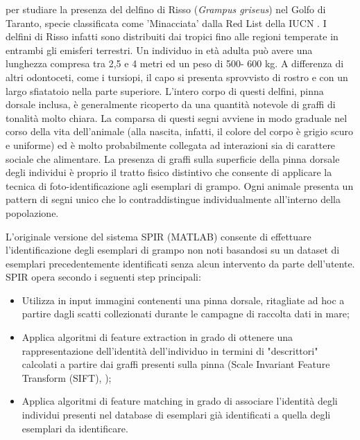 \documentclass[a4paper,12pt]{report}
\begin{document}
  per studiare la presenza del delfino di Risso (\textit{Grampus griseus}) nel Golfo di Taranto, specie classificata come 'Minacciata' dalla Red List della IUCN \cite{lanfredi2021grampus}. 
  I delfini di Risso infatti sono distribuiti dai 
  tropici fino alle regioni temperate in entrambi gli emisferi terrestri. Un individuo in 
  età adulta può avere una lunghezza compresa tra 2,5 e 4 metri ed un peso di 500-
  600 kg. A differenza di altri odontoceti, come i tursiopi, il capo si presenta sprovvisto di rostro 
  e con un largo sfiatatoio nella parte superiore. L’intero corpo di questi delfini, pinna dorsale 
  inclusa, è generalmente ricoperto da una quantità notevole di graffi di tonalità 
  molto chiara. La comparsa di questi segni avviene in modo graduale nel corso della 
  vita dell’animale (alla nascita, infatti, il colore del corpo è grigio scuro e uniforme) ed è molto probabilmente 
  collegata ad interazioni sia di carattere sociale che alimentare. La presenza di graffi sulla superficie della pinna dorsale degli individui è proprio 
  il tratto fisico distintivo che consente di 
  applicare la tecnica di foto-identificazione agli esemplari di grampo. Ogni animale presenta un pattern di segni unico che lo 
  contraddistingue individualmente all'interno della popolazione.

  L'originale versione del sistema SPIR (MATLAB) consente di effettuare l’identificazione degli esemplari di 
  grampo non noti basandosi su un dataset di esemplari precedentemente identificati senza alcun intervento da parte dell’utente. SPIR opera secondo i seguenti 
  step principali:
  \begin{itemize}
    \item Utilizza in input immagini contenenti una pinna dorsale, ritagliate ad hoc a 
    partire dagli scatti collezionati durante le campagne di raccolta dati
    in mare;      
    \item Applica algoritmi di feature extraction in grado di ottenere una 
    rappresentazione dell’identità dell’individuo in termini di "descrittori" calcolati 
    a partire dai graffi presenti sulla pinna (Scale
    Invariant Feature Transform (SIFT), \cite{reno2019sift});
    \item Applica algoritmi di feature matching in grado di associare l’identità degli individui presenti 
    nel database di esemplari già identificati a quella degli esemplari da identificare. 
  
  \end{itemize}
\end{document}
